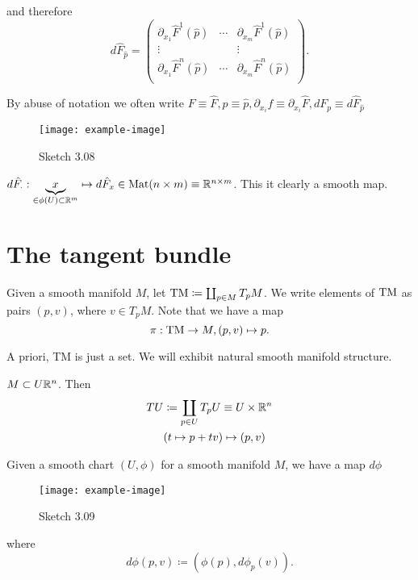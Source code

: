 and therefore 
\[d\hat{F}_{\hat{p}}=\begin{pmatrix}
    \partial_{x_1} \hat{F}^1(\hat{p}) & \cdots &\partial_{x_m} \hat{F}^1(\hat{p})\\
    \vdots & & \vdots \\
    \partial_{x_1} \hat{F}^n(\hat{p}) & \cdots &\partial_{x_m} \hat{F}^n(\hat{p})\\
\end{pmatrix}.\]


\begin{remark}
    By abuse of notation we often write \(F\equiv \hat{F},p\equiv \hat{p},\partial_{x_i}f\equiv \partial_{x_i}\hat{F}, dF_p\equiv d\hat{F}_{\hat{p}}\)
    \begin{figure}[H]
        \centering
        \texttt{[image: example-image]}
        \caption{Sketch 3.08}
    \end{figure}
\end{remark}

\begin{remark}
    \(d\hat{F}_{\cdot}:\underbrace{x}_{\in \phi(U)\subset \mathbb{R}^m}\mapsto d\hat{F}_x\in \text{Mat}(n\times m)\equiv \mathbb{R}^{n\times m}\). This it clearly 
    a smooth map.
\end{remark}

\section{The tangent bundle}

\begin{definition*}
    Given a smooth manifold \(M\), let \({\text{TM}}\coloneqq \coprod_{p\in M} T_p M\). We write 
    elements of \({\text{TM}}\) as pairs \((p,v)\), where \(v\in T_p M\). Note that we have a map 
    \[\pi:{\text{TM}}\to M, (p,v)\mapsto p.\]
\end{definition*}

A priori, TM is just a set. We will exhibit natural smooth manifold structure. 

 \(M\subset U\mathbb{R}^n\). Then \begin{align*}
    TU&\coloneqq \coprod_{p\in U} T_p U\equiv U\times \R^n\\
    & (t\mapsto  p+tv)\mapsto(p,v) %
\end{align*}

 Given a smooth chart \((U,\phi)\) for a smooth manifold \(M\), we have a map \(d\phi\)
\begin{figure}[H]
    \centering
    \texttt{[image: example-image]}
    \caption{Sketch 3.09}
\end{figure}
where \[d\phi(p,v)\coloneqq (\phi(p),d\phi_p(v)).\]

